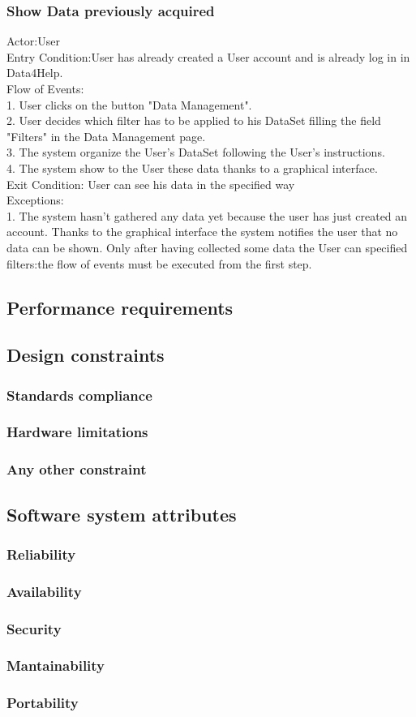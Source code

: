 \subsubsection{Show Data previously acquired}
Actor:User\\
Entry Condition:User has already created a User account and is already log in in Data4Help.\\
Flow of Events:\\
1. User clicks on the button "Data Management".\\
2. User decides which filter has to be applied to his DataSet filling the field "Filters" in the Data Management page.\\
3. The system organize the User's DataSet following the User's instructions.\\
4. The system show to the User these data thanks to a graphical interface. \\
Exit Condition: User can see his data in the specified way\\
Exceptions:\\
1. The system hasn't gathered any data yet because the user has just created an account. Thanks to the graphical interface the system notifies the user that no data can be shown. Only after having collected some data the User can specified filters:the flow of events must be executed from the first step.\\




  \subsection{Performance requirements}
  \subsection{Design constraints}
    \subsubsection{Standards compliance}
    \subsubsection{Hardware limitations}
    \subsubsection{Any other constraint}
  \subsection{Software system attributes}
    \subsubsection{Reliability}
    \subsubsection{Availability}
    \subsubsection{Security}
    \subsubsection{Mantainability}
    \subsubsection{Portability}
